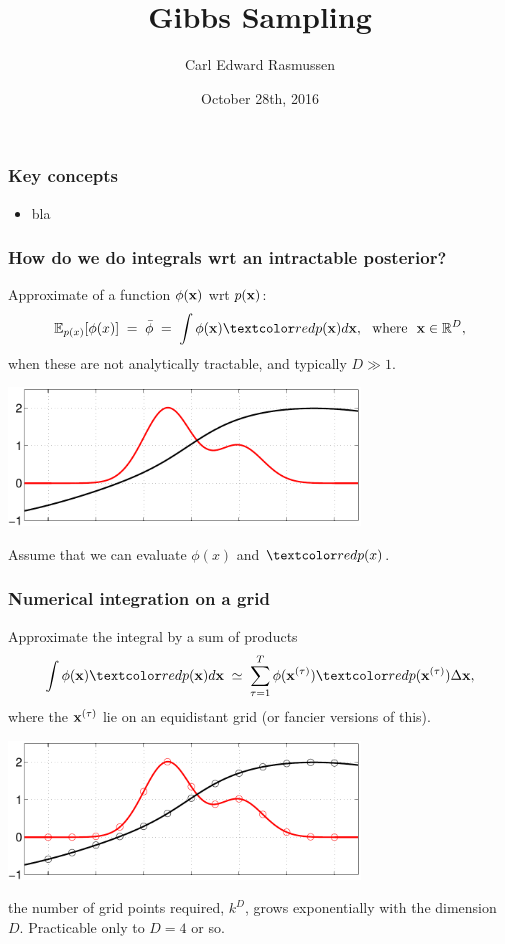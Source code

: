 

\title{Gibbs Sampling}
\author{Carl Edward Rasmussen}
\date{October 28th, 2016}




\begin{frame}
\titlepage
\end{frame}


\begin{frame}
\frametitle{Key concepts}

\begin{itemize}
\item bla
\end{itemize}

\end{frame}


\begin{frame}
\frametitle{How do we do integrals wrt an intractable posterior?}

Approximate  of a function $\phi(\mathbf x)$ wrt
 $p(\mathbf x)$:
\[
\E_{p(x)}[\phi(x)]\;=\;\bar\phi\;=\;\int \phi(\bfx)\Red{p(\bfx)}d\bfx,
\text{\ \ where\ \ }\bfx\in\R^D,
\]
when these are not analytically tractable, and typically $D\gg1$.
\begin{center}
\includegraphics[width=0.7\textwidth]{mc0}
\end{center}
Assume that we can evaluate $\phi(x)$ and $\Red{p(x)}$.
\end{frame}


\begin{frame}
\frametitle{Numerical integration on a grid}

Approximate the integral by a sum of products
\[
\int \phi(\bfx)\Red{p(\bfx)}d\bfx\;\simeq\;\sum_{\tau=1}^T\phi(\bfx^{(\tau)})\Red{p(\bfx^{(\tau)})}\Delta\bfx,
\]
where the $\mathbf x^{(\tau)}$ lie on an equidistant grid (or fancier
versions of this).

\centerline{\includegraphics[width=0.7\textwidth]{mc1}}

 the number of grid points required, $k^D$, grows
exponentially with the dimension $D$. Practicable only to $D=4$ or so.
\end{frame}


